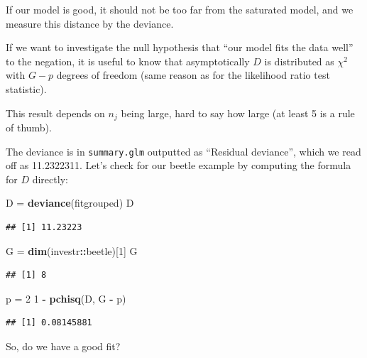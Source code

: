 \documentclass[
  ignorenonframetext,
]{beamer}
\newenvironment{Shaded}{\begin{snugshade}}{\end{snugshade}}
\newcommand{\DecValTok}[1]{\textcolor[rgb]{0.00,0.00,0.81}{#1}}
\newcommand{\FunctionTok}[1]{\textcolor[rgb]{0.13,0.29,0.53}{\textbf{#1}}}
\newcommand{\NormalTok}[1]{#1}
\newcommand{\OtherTok}[1]{\textcolor[rgb]{0.56,0.35,0.01}{#1}}
\newcommand{\SpecialCharTok}[1]{\textcolor[rgb]{0.81,0.36,0.00}{\textbf{#1}}}
\begin{document}
\begin{frame}
If our model is good, it should not be too far from the saturated model,
and we measure this distance by the deviance.

If we want to investigate the null hypothesis that ``our model fits the
data well'' to the negation, it is useful to know that asymptotically
\(D\) is distributed as \(\chi^2\) with \(G-p\) degrees of freedom (same
reason as for the likelihood ratio test statistic).

This result depends on \(n_j\) being large, hard to say how large (at
least 5 is a rule of thumb).
\end{frame}

\begin{frame}[fragile]
The deviance is in \texttt{summary.glm} outputted as ``Residual
deviance'', which we read off as 11.2322311. Let's check for our beetle
example by computing the formula for \(D\) directly:

\begin{Shaded}
\begin{Highlighting}[]
\NormalTok{D }\OtherTok{=} \FunctionTok{deviance}\NormalTok{(fitgrouped)}
\NormalTok{D}
\end{Highlighting}
\end{Shaded}

\begin{verbatim}
## [1] 11.23223
\end{verbatim}

\begin{Shaded}
\begin{Highlighting}[]
\NormalTok{G }\OtherTok{=} \FunctionTok{dim}\NormalTok{(investr}\SpecialCharTok{::}\NormalTok{beetle)[}\DecValTok{1}\NormalTok{]}
\NormalTok{G}
\end{Highlighting}
\end{Shaded}

\begin{verbatim}
## [1] 8
\end{verbatim}

\begin{Shaded}
\begin{Highlighting}[]
\NormalTok{p }\OtherTok{=} \DecValTok{2}
\DecValTok{1} \SpecialCharTok{{-}} \FunctionTok{pchisq}\NormalTok{(D, G }\SpecialCharTok{{-}}\NormalTok{ p)}
\end{Highlighting}
\end{Shaded}

\begin{verbatim}
## [1] 0.08145881
\end{verbatim}

So, do we have a good fit?
\end{frame}
\end{document}
